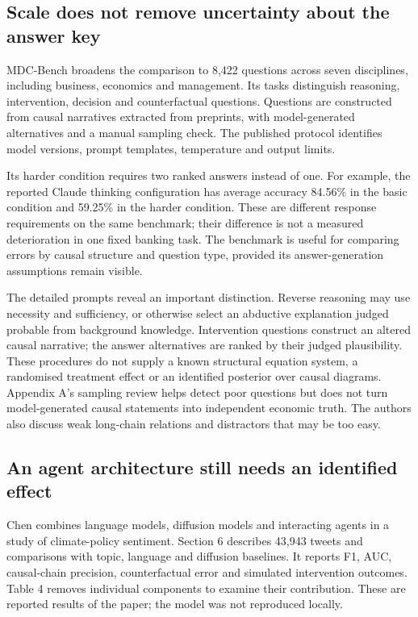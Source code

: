 \subsection{Scale does not remove uncertainty about the answer key}
MDC-Bench broadens the comparison to 8,422 questions across seven disciplines,
including business, economics and management. Its tasks distinguish reasoning,
intervention, decision and counterfactual questions. Questions are constructed
from causal narratives extracted from preprints, with model-generated
alternatives and a manual sampling check. The published protocol identifies
model versions, prompt templates, temperature and output limits.
\citep[Sections 2--3 and Appendix A]{gap29mdc}

Its harder condition requires two ranked answers instead of one. For example,
the reported Claude thinking configuration has average accuracy 84.56\% in
the basic condition and 59.25\% in the harder condition. These are different
response requirements on the same benchmark; their difference is not a
measured deterioration in one fixed banking task. The benchmark is useful
for comparing errors by causal structure and question type, provided its
answer-generation assumptions remain visible.

The detailed prompts reveal an important distinction. Reverse reasoning may
use necessity and sufficiency, or otherwise select an abductive explanation
judged probable from background knowledge. Intervention questions construct
an altered causal narrative; the answer alternatives are ranked by their
judged plausibility. These procedures do not supply a known structural
equation system, a randomised treatment effect or an identified posterior
over causal diagrams. Appendix A's sampling review helps detect poor
questions but does not turn model-generated causal statements into independent
economic truth. The authors also discuss weak long-chain relations and
distractors that may be too easy. \citep[Limitations; Tables 28--29 and
39--40]{gap29mdc}

\subsection{An agent architecture still needs an identified effect}
Chen combines language models, diffusion models and interacting agents in a
study of climate-policy sentiment. Section 6 describes 43,943 tweets and
comparisons with topic, language and diffusion baselines. It reports F1,
AUC, causal-chain precision, counterfactual error and simulated intervention
outcomes. Table 4 removes individual components to examine their contribution.
These are reported results of the paper; the model was not reproduced
locally. \citep[Sections 5.6 and 6; Tables 1--4]{gap29chen}

